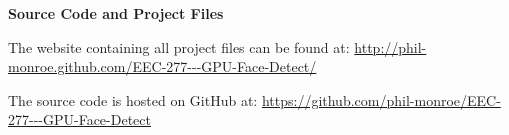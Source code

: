 \documentclass[12pt] {article}
\begin{document}
\vspace{2cm}


{\large \bf {Source Code and Project Files}}
\vspace{5 mm}

The website containing all project files can be found at:
\newline \url {http://phil-monroe.github.com/EEC-277---GPU-Face-Detect/}

\vspace{5 mm}

The source code is hosted on GitHub at:
\newline \url {https://github.com/phil-monroe/EEC-277---GPU-Face-Detect}
\end{document}
